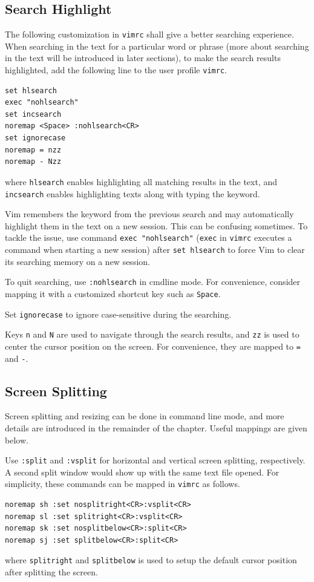\subsection{Search Highlight}

The following customization in \verb|vimrc| shall give a better searching experience. When searching in the text for a particular word or phrase (more about searching in the text will be introduced in later sections), to make the search results highlighted, add the following line to the user profile \verb|vimrc|.
\begin{lstlisting}
set hlsearch
exec "nohlsearch"
set incsearch
noremap <Space> :nohlsearch<CR>
set ignorecase
noremap = nzz
noremap - Nzz
\end{lstlisting}
where \verb|hlsearch| enables highlighting all matching results in the text, and \verb|incsearch| enables highlighting texts along with typing the keyword. 

Vim remembers the keyword from the previous search and may automatically highlight them in the text on a new session. This can be confusing sometimes. To tackle the issue, use command \verb|exec "nohlsearch"| (\verb|exec| in \verb|vimrc| executes a command when starting a new session) after \verb|set hlsearch| to force Vim to clear its searching memory on a new session. 

To quit searching, use \verb|:nohlsearch| in cmdline mode. For convenience, consider mapping it with a customized shortcut key such as \verb|Space|. 

Set \verb|ignorecase| to ignore case-sensitive during the searching.

Keys \verb|n| and \verb|N| are used to navigate through the search results, and \verb|zz| is used to center the cursor position on the screen. For convenience, they are mapped to \verb|=| and \verb|-|.

\subsection{Screen Splitting}

Screen splitting and resizing can be done in command line mode, and more details are introduced in the remainder of the chapter. Useful mappings are given below.

Use \verb|:split| and \verb|:vsplit| for horizontal and vertical screen splitting, respectively. A second split window would show up with the same text file opened. For simplicity, these commands can be mapped in \verb|vimrc| as follows.
\begin{lstlisting}
noremap sh :set nosplitright<CR>:vsplit<CR>
noremap sl :set splitright<CR>:vsplit<CR>
noremap sk :set nosplitbelow<CR>:split<CR>
noremap sj :set splitbelow<CR>:split<CR>
\end{lstlisting}
where \verb|splitright| and \verb|splitbelow| is used to setup the default cursor position after splitting the screen.

